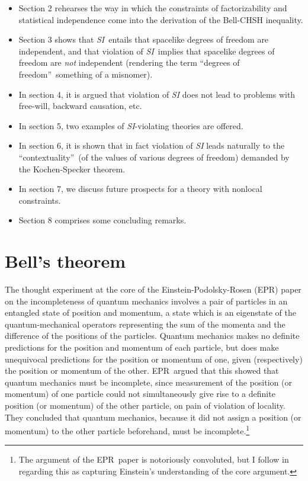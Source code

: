\documentclass[12pt]{article}%
\begin{document}
\begin{itemize}
\item Section 2 rehearses the way in which the constraints of factorizability
and statistical independence come into the derivation of the Bell-CHSH inequality.

\item Section 3 shows that \emph{SI}\ entails that spacelike degrees of
freedom are independent, and that violation of \emph{SI}\ implies that
spacelike degrees of freedom are \emph{not} independent (rendering the term
\textquotedblleft degrees of freedom\textquotedblright\ something of a misnomer).

\item In section 4, it is argued that violation of \emph{SI} does not lead to
problems with free-will, backward causation, etc.

\item In section 5, two examples of \emph{SI}-violating theories are offered.

\item In section 6, it is shown that in fact violation of \emph{SI} leads
naturally to the \textquotedblleft contextuality\textquotedblright\ (of the
values of various degrees of freedom) demanded by the Kochen-Specker theorem.

\item In section 7, we discuss future prospects for a theory with nonlocal constraints.

\item Section 8 comprises some concluding remarks.
\end{itemize}

\section{Bell's theorem}

The thought experiment at the core of the Einstein-Podolsky-Rosen (EPR) paper
on the incompleteness of quantum mechanics \cite{EPR35} involves a pair of
particles in an entangled state of position and momentum, a state which is an
eigenstate of the quantum-mechanical operators representing the sum of the
momenta and the difference of the positions of the particles. Quantum
mechanics makes no definite predictions for the position and momentum of each
particle, but does make unequivocal predictions for the position or momentum
of one, given (respectively) the position or momentum of the other.
EPR\ argued that this showed that quantum mechanics must be incomplete, since
measurement of the position (or momentum) of one particle could not
simultaneously give rise to a definite position (or momentum) of the other
particle, on pain of violation of locality. They concluded that quantum
mechanics, because it did not assign a position (or momentum) to the other
particle beforehand, must be incomplete.\footnote{The argument of the
EPR\ paper is notoriously convoluted, but I follow \cite{Fin86} in regarding
this as capturing Einstein's understanding of the core argument.}
\end{document}
